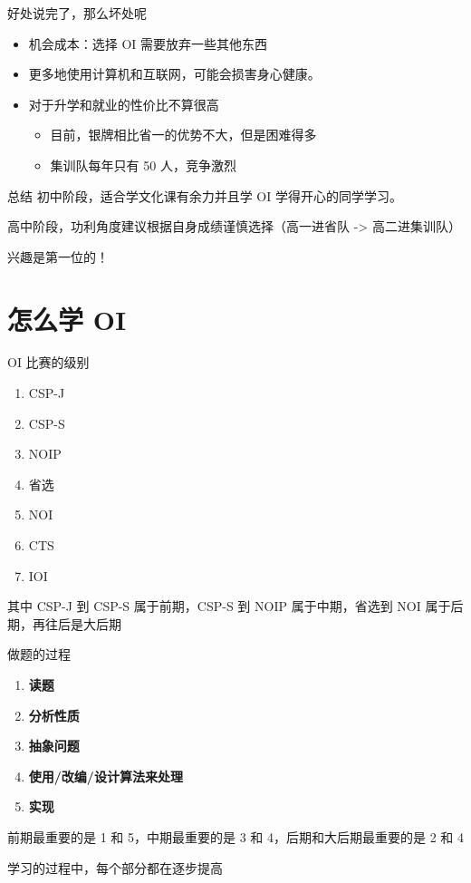 \documentclass[11pt,aspectratio=169]{beamer}
\begin{document}
\begin{frame}{好处说完了，那么坏处呢}
    \begin{itemize}
        \item 机会成本：选择 OI 需要放弃一些其他东西
        \item 更多地使用计算机和互联网，可能会损害身心健康。
        \item 对于升学和就业的性价比不算很高
        \begin{itemize}
            \item 目前，银牌相比省一的优势不大，但是困难得多
            \item 集训队每年只有 50 人，竞争激烈
        \end{itemize}
    \end{itemize}
\end{frame}

\begin{frame}{总结}
    初中阶段，适合学文化课有余力并且学 OI 学得开心的同学学习。

    高中阶段，功利角度建议根据自身成绩谨慎选择（高一进省队 -> 高二进集训队）

    兴趣是第一位的！
\end{frame}
\section{怎么学 OI}

\begin{frame}{OI 比赛的级别}
    \begin{enumerate}
        \item CSP-J
        \item CSP-S
        \item NOIP
        \item 省选
        \item NOI
        \item CTS
        \item IOI
    \end{enumerate}
    其中 CSP-J 到 CSP-S 属于前期，CSP-S 到 NOIP 属于中期，省选到 NOI 属于后期，再往后是大后期
\end{frame}

\begin{frame}{做题的过程}
\begin{enumerate}
    \item \textbf{读题}
    \item \textbf{分析性质}
    \item \textbf{抽象问题}
    \item \textbf{使用/改编/设计算法来处理}
    \item \textbf{实现}
\end{enumerate}

前期最重要的是 1 和 5，中期最重要的是 3 和 4，后期和大后期最重要的是 2 和 4

学习的过程中，每个部分都在逐步提高
\end{frame}
\end{document}
